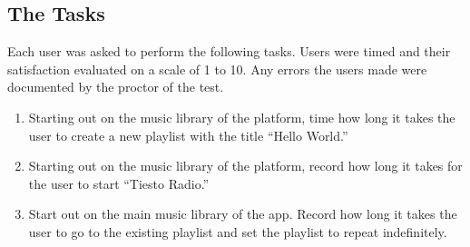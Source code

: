 \documentclass[a4paper]{article}
\begin{document}
\subsection{The Tasks}
Each user was asked to perform the following tasks. Users were timed and their satisfaction evaluated on a scale of 1 to 10. Any errors the users made were documented by the proctor of the test.
\begin{enumerate}
\item Starting out on the music library of the platform, time how long it takes the user to create a new playlist with the title ``Hello World.''
\item Starting out on the music library of the platform, record how long it takes for the user to start ``Tiesto Radio.''
\item Start out on the main music library of the app. Record how long it takes the user to go to the existing playlist and set the playlist to repeat indefinitely.
\end{enumerate}
\end{document}
